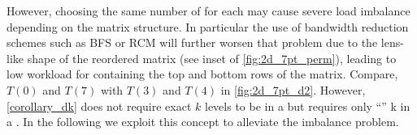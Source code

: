 However, choosing the same number of \levels for each \levelGroup may
cause severe load imbalance depending on the matrix structure. In
particular the use of bandwidth reduction schemes such as BFS or RCM
will further worsen that problem due to the lens-like shape of the
reordered matrix (see inset of \cref{fig:2d_7pt_perm}), leading to low
workload for \levelGroups containing the top and bottom rows of the
  matrix. Compare, \eg $T(0)$ and $T(7)$ with $T(3)$ and $T(4)$ in
\cref{fig:2d_7pt_d2}. However, \cref{corollary_dk} does not require
exact $k$ levels to be in a \levelGroup but  
requires only ``\atleast'' k \levels in a \levelGroup. In
the following we exploit this concept to alleviate the imbalance
problem.
  
